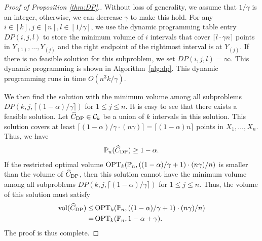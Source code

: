 \begin{proof}[Proof of Proposition \ref{thm:DP}.]
    Without loss of generality, we assume that $1/\gamma$ is an integer, otherwise, we can decrease $\gamma$ to make this hold.
    For any $i \in [k], j \in [n], l \in [ 1/\gamma ]$, we use the dynamic programming table entry $DP(i,j,l)$ to store the minimum volume of $i$ intervals that cover $ \lceil l\cdot \gamma n \rceil$ points in $Y_{(1)},\dots, Y_{(j)}$ and the right endpoint of the rightmost interval is at $Y_{(j)}$. 
    If there is no feasible solution for this subproblem, we set $DP(i,j,l) = \infty$. 
    This dynamic programming is shown in Algorithm~\ref{alg:dp}.
    This dynamic programming runs in time $O(n^3k /\gamma)$.

    We then find the solution with the minimum volume among all subproblems $DP(k,j, \lceil (1-\alpha)/\gamma \rceil )$ for $1\leq j \leq n$. It is easy to see that there exists a feasible solution. Let $\widehat{C}_{\rm DP} \in \mathcal{C}_k$ be a union of $k$ intervals in this solution. This solution covers at least $ \lceil (1-\alpha)/\gamma \cdot (n\gamma) \rceil  = \lceil (1-\alpha) n \rceil$ points in $X_1,\dots, X_n$. Thus, we have 
    \begin{align*}
        \mathbb{P}_n(\widehat{C}_{\rm DP})\geq 1-\alpha.
    \end{align*}
    If the restricted optimal volume $\operatorname{OPT}_k(\mathbb{P}_n, ((1-\alpha)/\gamma+1) \cdot (n\gamma)/n )$ is smaller than the volume of $\widehat{C}_{\rm DP}$, then this solution cannot have the minimum volume among all subproblems $DP(k,j, \lceil (1-\alpha)/\gamma \rceil )$ for $1\leq j \leq n$. Thus, the volume of this solution must satisfy
    \begin{align*}
        \mathrm{vol}(\widehat{C}_{\rm DP}) \leq& \operatorname{OPT}_k(\mathbb{P}_n, ((1-\alpha)/\gamma+1) \cdot (n\gamma) / n) \\
        =& \operatorname{OPT}_k(\mathbb{P}_n,1-\alpha + \gamma).
    \end{align*}
    The proof is thus complete.
\end{proof}

